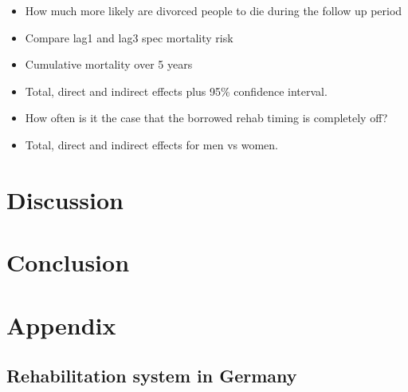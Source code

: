 \documentclass[a4paper,12pt]{article}
\theoremstyle{plain}
\theoremstyle{definition}
\theoremstyle{TheoremNum}
\theoremstyle{CorollaryNum}
\theoremstyle{PropositionNum}
\theoremstyle{TheoremNum}
\begin{document}
{\color{red}
\begin{itemize}
\item[DONE] How much more likely are divorced people to die during the follow up period
\item[DONE] Compare lag1 and lag3 spec mortality risk
\item[DONE] Cumulative mortality over 5 years
\item Total, direct and indirect effects plus 95\% confidence interval.
\item How often is it the case that the borrowed rehab timing is completely off?
\item Total, direct and indirect effects for men vs women. 
\end{itemize}}

\section{Discussion}

\section{Conclusion}

\printbibliography[title={References}]

% 
% 

\section*{Appendix}

\subsection*{Rehabilitation system in Germany}
\makeatletter
\def\@currentlabelname{Rehabilitation system in Germany}
\makeatother
\label{app:rehab_germany}
\end{document}
